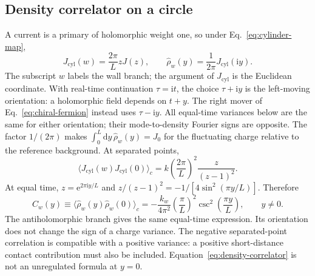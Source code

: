\documentclass[aps,prb,onecolumn,nofootinbib,superscriptaddress]{revtex4-2}
\newcommand{\dd}{\mathrm{d}}
\newcommand{\ii}{\mathrm{i}}
\newcommand{\e}{\mathrm{e}}
\begin{document}
\subsection{Density correlator on a circle}
A current is a primary of holomorphic weight one, so under
Eq.~\eqref{eq:cylinder-map},
\begin{equation}
 J_{\mathrm{cyl}}(w)=\frac{2\pi}{L}zJ(z),\qquad
 \hat\rho_w(y)=\frac{1}{2\pi}J_{\mathrm{cyl}}(\ii y).
 \label{eq:physical-density}
\end{equation}
The subscript $w$ labels the wall branch; the argument of
$J_{\mathrm{cyl}}$ is the Euclidean coordinate.
With real-time continuation $\tau=\ii t$, the choice $\tau+\ii y$
is the left-moving orientation: a holomorphic field depends on $t+y$.
The right mover of Eq.~\eqref{eq:chiral-fermion} instead uses
$\tau-\ii y$. All equal-time variances below are the same for either
orientation; their mode-to-density Fourier signs are opposite.
The factor $1/(2\pi)$ makes
$\int_0^L\dd y\,\hat\rho_w(y)=J_0$ for the fluctuating charge relative
to the reference background. At separated points,
\begin{equation}
 \langle J_{\mathrm{cyl}}(w)J_{\mathrm{cyl}}(0)\rangle_c
 =k\left(\frac{2\pi}{L}\right)^2\frac{z}{(z-1)^2}.
\end{equation}
At equal time, $z=\e^{2\pi\ii y/L}$ and
$z/(z-1)^2=-1/[4\sin^2(\pi y/L)]$. Therefore
\begin{equation}
 C_w(y)\equiv\langle\hat\rho_w(y)\hat\rho_w(0)\rangle_c
 =-\frac{k_w}{4\pi^2}\left(\frac{\pi}{L}\right)^2
    \csc^2\left(\frac{\pi y}{L}\right),\qquad y\ne0 .
 \label{eq:density-correlator}
\end{equation}
The antiholomorphic branch gives the same equal-time expression. Its
orientation does not change the sign of a charge variance.
The negative separated-point correlation is compatible with a positive
variance: a positive short-distance contact contribution must also be
included. Equation~\eqref{eq:density-correlator} is not an unregulated
formula at $y=0$.
\end{document}
